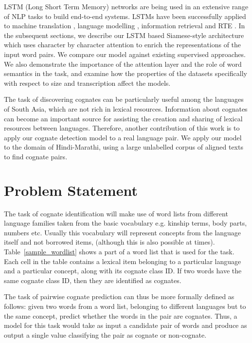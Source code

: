 \documentclass[11pt,letterpaper]{article}
\begin{document}
LSTM (Long Short Term Memory) networks are being used in an extensive range of NLP tasks to build end-to-end systems. LSTMs have been successfully applied to machine translation \cite{bahdanau2014neural}, language modelling \cite{mikolov2010recurrent}, information retrieval \cite{sordoni2015hierarchical} and RTE \cite{snli:emnlp2015}. In the subsequent sections, we describe our LSTM based Siamese-style architecture which uses character by character attention to enrich the representations of the input word pairs. We compare our model against existing supervised approaches. We also demonstrate the importance of the attention layer and the role of word semantics in the task, and examine how the properties of the datasets specifically with respect to size and transcription affect the models.

The task of discovering cognates can be particularly useful among the languages of South Asia, which are not rich in lexical resources. Information about cognates can become an important source for assisting the creation and sharing of lexical resources between languages. Therefore, another contribution of this work is to apply our cognate detection model to a real language pair. We apply our model to the domain of Hindi-Marathi, using a large unlabelled corpus of aligned texts to find cognate pairs.

\section{Problem Statement}

The task of cognate identification will make use of word lists from different language families taken from the basic vocabulary e.g.  kinship terms, body parts, numbers etc. Usually this vocabulary will represent concepts from the language itself and not borrowed items, (although this is also possible at times). Table~\ref{sample_wordlist} shows a part of a word list that is used for the task. Each cell in the table contains a lexical item belonging to a particular language and a particular concept, along with its cognate class ID. If two words have the same cognate class ID, then they are identified as cognates.

The task of pairwise cognate prediction can thus be more formally defined as follows:  given two words from a word list, belonging to different languages but to the same concept, predict whether the words in the pair are cognates. Thus, a model for this task would take as input a candidate pair of words and produce as output a single value classifying the pair as cognate or non-cognate. 
\end{document}
